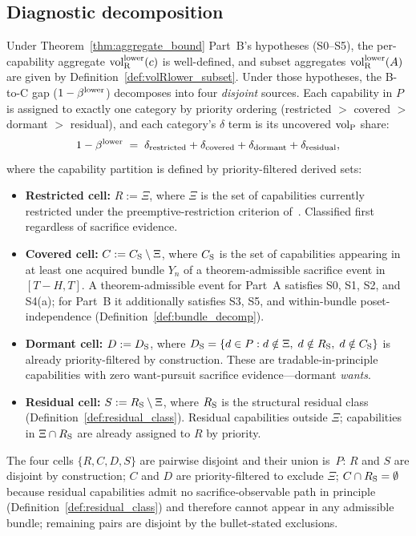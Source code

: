 \subsection{Diagnostic decomposition}

\begin{definition}
\label{def:gap_decomp}
Under Theorem~\ref{thm:aggregate_bound} Part~B's hypotheses
(S0--S5), the per-capability aggregate ${\operatorname{vol}_{\mathrm{R}}^{\mathrm{lower}}}(c)$ is
well-defined, and subset aggregates ${\operatorname{vol}_{\mathrm{R}}^{\mathrm{lower}}}(A)$ are given
by Definition~\ref{def:volRlower_subset}.  Under those
hypotheses, the B-to-C gap ($1 - \beta^{\mathrm{lower}}$) decomposes into four
\emph{disjoint} sources.  Each capability in $P$ is assigned to
exactly one category by priority ordering (restricted $>$
covered $>$ dormant $>$ residual), and each category's $\delta$
term is its uncovered ${\operatorname{vol}_{\mathrm{P}}}$ share:
\[
  1 - \beta^{\mathrm{lower}} \;=\; \delta_{\mathrm{restricted}}
  + \delta_{\mathrm{covered}} + \delta_{\mathrm{dormant}}
  + \delta_{\mathrm{residual}},
\]
where the capability partition is defined by priority-filtered
derived sets:
\begin{itemize}
\item \textbf{Restricted cell:} $R := \Xi$, where $\Xi$ is the
  set of capabilities currently restricted under the
  preemptive-restriction criterion
  of~\citep[Proposition~1]{lasser2026horizon}.  Classified first
  regardless of sacrifice evidence.
\item \textbf{Covered cell:} $C := C_{\mathrm{S}} \setminus \Xi$, where
  $C_{\mathrm{S}}$ is the set of capabilities appearing in at least one
  acquired bundle $Y_n$ of a theorem-admissible sacrifice event
  in $[T - H, T]$.  A theorem-admissible event for Part~A
  satisfies S0, S1, S2, and S4(a); for Part~B it additionally
  satisfies S3, S5, and within-bundle poset-independence
  (Definition~\ref{def:bundle_decomp}).
\item \textbf{Dormant cell:} $D := D_{\mathrm{S}}$, where
  $D_{\mathrm{S}} = \{d \in P : d \notin \Xi,\; d \notin R_{\mathrm{S}},\;
  d \notin C_{\mathrm{S}}\}$ is already priority-filtered by
  construction.  These are tradable-in-principle capabilities
  with zero want-pursuit sacrifice evidence---dormant
  \emph{wants}.
\item \textbf{Residual cell:} $S := R_{\mathrm{S}} \setminus \Xi$, where
  $R_{\mathrm{S}}$ is the structural residual class
  (Definition~\ref{def:residual_class}).  Residual capabilities
  outside $\Xi$; capabilities in $\Xi \cap R_{\mathrm{S}}$ are already
  assigned to $R$ by priority.
\end{itemize}
The four cells $\{R, C, D, S\}$ are pairwise disjoint and their
union is~$P$: $R$ and $S$ are disjoint by construction; $C$ and
$D$ are priority-filtered to exclude $\Xi$; $C \cap R_{\mathrm{S}} =
\emptyset$ because residual capabilities admit no
sacrifice-observable path in principle
(Definition~\ref{def:residual_class}) and therefore cannot
appear in any admissible bundle; remaining pairs are disjoint by
the bullet-stated exclusions.


\end{definition}

